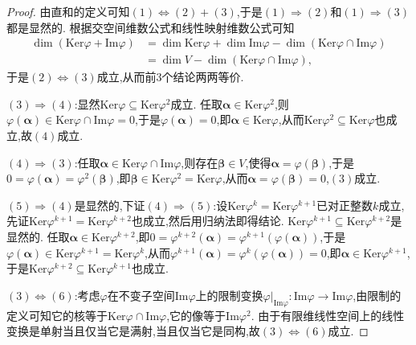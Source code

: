 \documentclass[../../main.tex]{subfiles}%
\begin{document}
\begin{proof}
由直和的定义可知\((1)\Leftrightarrow(2)+(3)\),于是\((1)\Rightarrow(2)\)和\((1)\Rightarrow(3)\)都是显然的. 根据交空间维数公式和线性映射维数公式可知
\begin{align*}
\dim(\text{Ker}\varphi+\text{Im}\varphi)&=\dim\text{Ker}\varphi+\dim\text{Im}\varphi-\dim(\text{Ker}\varphi\cap\text{Im}\varphi)\\
&=\dim V-\dim(\text{Ker}\varphi\cap\text{Im}\varphi),
\end{align*}
于是\((2)\Leftrightarrow(3)\)成立,从而前3个结论两两等价.

\((3)\Rightarrow(4)\):显然\(\text{Ker}\varphi\subseteq\text{Ker}\varphi^2\)成立. 任取\(\boldsymbol{\alpha}\in\text{Ker}\varphi^2\),则\(\varphi(\boldsymbol{\alpha})\in\text{Ker}\varphi\cap\text{Im}\varphi = 0\),于是\(\varphi(\boldsymbol{\alpha}) = 0\),即\(\boldsymbol{\alpha}\in\text{Ker}\varphi\),从而\(\text{Ker}\varphi^2\subseteq\text{Ker}\varphi\)也成立,故\((4)\)成立.

\((4)\Rightarrow(3)\):任取\(\boldsymbol{\alpha}\in\text{Ker}\varphi\cap\text{Im}\varphi\),则存在\(\boldsymbol{\beta}\in V\),使得\(\boldsymbol{\alpha}=\varphi(\boldsymbol{\beta})\),于是\(0=\varphi(\boldsymbol{\alpha})=\varphi^2(\boldsymbol{\beta})\),即\(\boldsymbol{\beta}\in\text{Ker}\varphi^2=\text{Ker}\varphi\),从而\(\boldsymbol{\alpha}=\varphi(\boldsymbol{\beta}) = 0\),\((3)\)成立.

\((5)\Rightarrow(4)\)是显然的,下证\((4)\Rightarrow(5)\):设\(\text{Ker}\varphi^k=\text{Ker}\varphi^{k + 1}\)已对正整数\(k\)成立,先证\(\text{Ker}\varphi^{k + 1}=\text{Ker}\varphi^{k + 2}\)也成立,然后用归纳法即得结论. \(\text{Ker}\varphi^{k + 1}\subseteq\text{Ker}\varphi^{k + 2}\)是显然的. 任取\(\boldsymbol{\alpha}\in\text{Ker}\varphi^{k + 2}\),即\(0=\varphi^{k + 2}(\boldsymbol{\alpha})=\varphi^{k + 1}(\varphi(\boldsymbol{\alpha}))\),于是\(\varphi(\boldsymbol{\alpha})\in\text{Ker}\varphi^{k + 1}=\text{Ker}\varphi^k\),从而\(\varphi^{k + 1}(\boldsymbol{\alpha})=\varphi^k(\varphi(\boldsymbol{\alpha})) = 0\),即\(\boldsymbol{\alpha}\in\text{Ker}\varphi^{k + 1}\),于是\(\text{Ker}\varphi^{k + 2}\subseteq\text{Ker}\varphi^{k + 1}\)也成立.

\((3)\Leftrightarrow(6)\):考虑\(\varphi\)在不变子空间\(\text{Im}\varphi\)上的限制变换\(\varphi|_{\text{Im}\varphi}:\text{Im}\varphi\to\text{Im}\varphi\),由限制的定义可知它的核等于\(\text{Ker}\varphi\cap\text{Im}\varphi\),它的像等于\(\text{Im}\varphi^2\). 由于有限维线性空间上的线性变换是单射当且仅当它是满射,当且仅当它是同构,故\((3)\Leftrightarrow(6)\)成立.


\end{proof}
\end{document}
